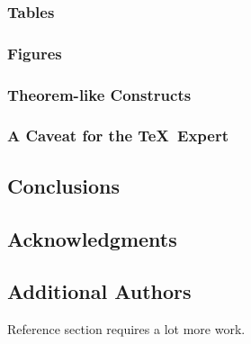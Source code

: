 \documentclass{aamas2016}
\begin{document}
{\subsubsection{Tables}
\subsubsection{Figures}
\subsubsection{Theorem-like Constructs}
\subsubsection*{A Caveat for the \TeX\ Expert}
\subsection{Conclusions}
\subsection{Acknowledgments}
\subsection{Additional Authors}

}

%
%


{\color{red} Reference section requires a lot more work.}
%
\end{document}
